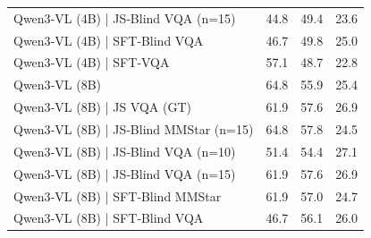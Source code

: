 \begin{tabular}{lrrr}
Qwen3‑VL (4B) | JS‑Blind VQA (n=15) & 44.8 & 49.4 & 23.6 \\
Qwen3‑VL (4B) | SFT‑Blind VQA & 46.7 & 49.8 & 25.0 \\
Qwen3‑VL (4B) | SFT‑VQA & 57.1 & 48.7 & 22.8 \\
Qwen3‑VL (8B) & 64.8 & 55.9 & 25.4 \\
Qwen3‑VL (8B) | JS VQA (GT) & 61.9 & 57.6 & 26.9 \\
Qwen3‑VL (8B) | JS‑Blind MMStar (n=15) & 64.8 & 57.8 & 24.5 \\
Qwen3‑VL (8B) | JS‑Blind VQA (n=10) & 51.4 & 54.4 & 27.1 \\
Qwen3‑VL (8B) | JS‑Blind VQA (n=15) & 61.9 & 57.6 & 26.9 \\
Qwen3‑VL (8B) | SFT‑Blind MMStar & 61.9 & 57.0 & 24.7 \\
Qwen3‑VL (8B) | SFT‑Blind VQA & 46.7 & 56.1 & 26.0 \\
\bottomrule
\end{tabular}
